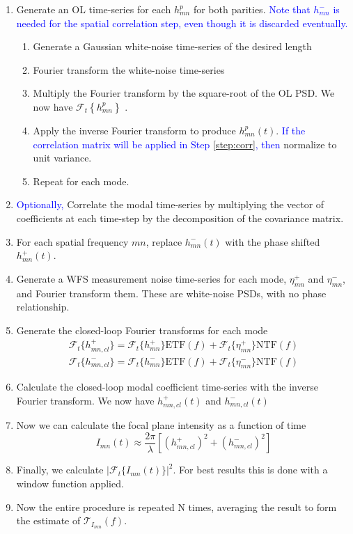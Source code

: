 \documentclass[10pt,preprint]{aastex631}
\newcommand{\jrmadd}[1]{\textcolor{blue}{#1}}
\begin{document}
\begin{enumerate}
\item Generate an OL time-series for each $h_{mn}^p$ for both parities.  \jrmadd{Note that $h_{mn}^-$ is needed for the spatial correlation step, even though it is discarded eventually.} \label{step:olh}
\begin{enumerate}
\item Generate a Gaussian white-noise time-series of the desired length
\item Fourier transform the white-noise time-series
\item Multiply the Fourier transform by the square-root of the OL PSD.  We now have $\mathcal{F}_t\left\{h_{mn}^p\right\}$ \citep[cf.][]{kasdin_falpha}.
\item Apply the inverse Fourier transform to produce $h_{mn}^p(t)$.  \jrmadd{If the correlation matrix will be applied in Step \ref{step:corr}, then} normalize to unit variance.
\item Repeat for each mode.
\end{enumerate}
\item \jrmadd{Optionally,} Correlate the modal time-series by multiplying the vector of coefficients at each time-step by the decomposition of the covariance matrix. \label{step:corr}
\item For each spatial frequency $mn$, replace $h_{mn}^-(t)$ with the phase shifted $h_{mn}^+(t)$.
\item Generate a WFS measurement noise time-series for each mode, $\eta_{mn}^+$ and $\eta_{mn}^-$, and Fourier transform them.  These are white-noise PSDs, with no phase relationship.
\item Generate the closed-loop Fourier transforms for each mode \label{step:clh}
\begin{eqnarray}
\mathcal{F}_t\{h_{mn,cl}^+\} = \mathcal{F}_t\{h_{mn}^+\} \mathrm{ETF}(f) + \mathcal{F}_t\{\eta_{mn}^+\} \mathrm{NTF}(f) \\
\mathcal{F}_t\{h_{mn,cl}^-\} = \mathcal{F}_t\{h_{mn}^-\} \mathrm{ETF}(f) + \mathcal{F}_t\{\eta_{mn}^-\} \mathrm{NTF}(f) \nonumber
\end{eqnarray}
\item Calculate the closed-loop modal coefficient time-series with the inverse Fourier transform.  We now have $h_{mn,cl}^+(t)$ and $h_{mn,cl}^-(t)$ 
\item Now we can calculate the focal plane intensity as a function of time
\begin{equation}
I_{mn}(t) \approx \frac{2\pi}{\lambda}\left[ \left(h_{mn,cl}^+\right)^2 + \left(h_{mn,cl}^-\right)^2 \right] 
\end{equation}
\item Finally, we calculate $|\mathcal{F}_t\{I_{mn}(t)\}|^2$.  For best results this is done with a window function applied.
\item Now the entire procedure is repeated N times, averaging the result to form the estimate of $\mathcal{T}_{I_{mn}}(f)$.
\end{enumerate}
\end{document}

